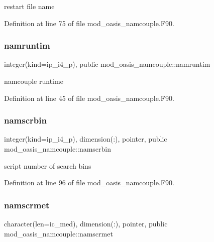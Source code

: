restart file name 



Definition at line 75 of file mod\+\_\+oasis\+\_\+namcouple.\+F90.

\mbox{\label{namespacemod__oasis__namcouple_a14505eaa91b2c8ba308c63ff78652206}} 
\subsubsection{\texorpdfstring{namruntim}{namruntim}}
{\footnotesize\ttfamily integer(kind=ip\+\_\+i4\+\_\+p), public mod\+\_\+oasis\+\_\+namcouple\+::namruntim}



namcouple runtime 



Definition at line 45 of file mod\+\_\+oasis\+\_\+namcouple.\+F90.

\mbox{\label{namespacemod__oasis__namcouple_a728405e8f669b58d00c189abf8b62437}} 
\subsubsection{\texorpdfstring{namscrbin}{namscrbin}}
{\footnotesize\ttfamily integer(kind=ip\+\_\+i4\+\_\+p), dimension(\+:), pointer, public mod\+\_\+oasis\+\_\+namcouple\+::namscrbin}



script number of search bins 



Definition at line 96 of file mod\+\_\+oasis\+\_\+namcouple.\+F90.

\mbox{\label{namespacemod__oasis__namcouple_a51c19e0892a72acc3dca2adb046ed175}} 
\subsubsection{\texorpdfstring{namscrmet}{namscrmet}}
{\footnotesize\ttfamily character(len=ic\+\_\+med), dimension(\+:), pointer, public mod\+\_\+oasis\+\_\+namcouple\+::namscrmet}



